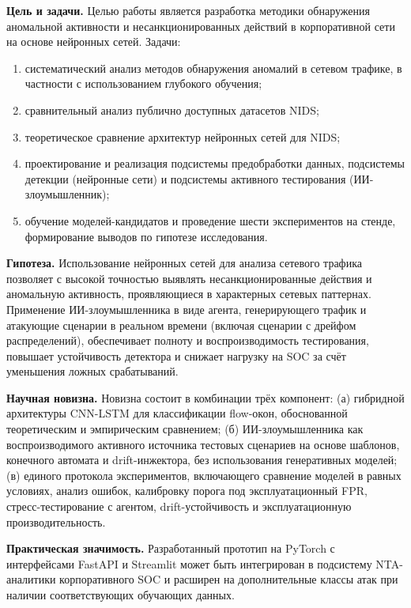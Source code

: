 \documentclass[14pt, a4paper]{extarticle}
\begin{document}
\textbf{Цель и задачи.} Целью работы является разработка методики
обнаружения аномальной активности и несанкционированных действий в
корпоративной сети на основе нейронных сетей. Задачи:

\begin{enumerate}
    \item систематический анализ методов обнаружения аномалий в сетевом
    трафике, в частности с использованием глубокого обучения;
    \item сравнительный анализ публично доступных датасетов NIDS;
    \item теоретическое сравнение архитектур нейронных сетей для NIDS;
    \item проектирование и реализация подсистемы предобработки данных,
    подсистемы детекции (нейронные сети) и подсистемы активного тестирования
    (ИИ-злоумышленник);
    \item обучение моделей-кандидатов и проведение шести
    экспериментов на стенде, формирование выводов по гипотезе исследования.
\end{enumerate}

\textbf{Гипотеза.} Использование нейронных сетей для анализа сетевого
трафика позволяет с высокой точностью выявлять несанкционированные действия
и аномальную активность, проявляющиеся в характерных сетевых паттернах.
Применение ИИ-злоумышленника в виде агента, генерирующего трафик и атакующие
сценарии в реальном времени (включая сценарии с дрейфом распределений),
обеспечивает полноту и воспроизводимость тестирования, повышает устойчивость
детектора и снижает нагрузку на SOC за счёт уменьшения ложных срабатываний.

\textbf{Научная новизна.} Новизна состоит в комбинации трёх компонент:
(а) гибридной архитектуры CNN-LSTM для классификации flow-окон, обоснованной
теоретическим и эмпирическим сравнением; (б) ИИ-злоумышленника как
воспроизводимого активного источника тестовых сценариев на основе шаблонов,
конечного автомата и drift-инжектора, без использования генеративных моделей;
(в) единого протокола экспериментов, включающего сравнение моделей в равных
условиях, анализ ошибок, калибровку порога под эксплуатационный FPR,
стресс-тестирование с агентом, drift-устойчивость и эксплуатационную
производительность.

\textbf{Практическая значимость.} Разработанный прототип на PyTorch с
интерфейсами FastAPI и Streamlit может быть интегрирован в подсистему
NTA-аналитики корпоративного SOC и расширен на дополнительные классы
атак при наличии соответствующих обучающих данных.
\end{document}
